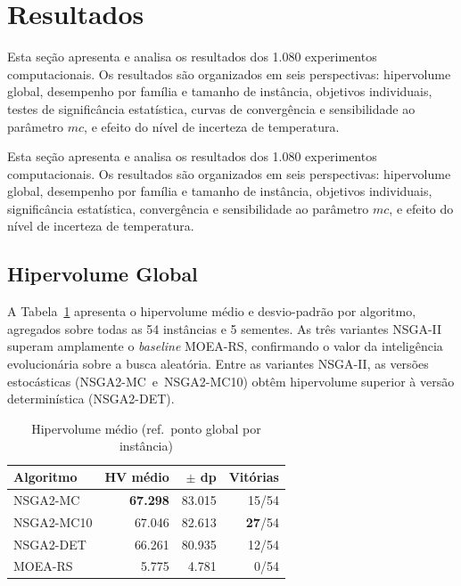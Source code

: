 \documentclass[a4paper,11pt]{article}
\newcommand{\nsmc}{NSGA2\mbox{-}MC\xspace}
\newcommand{\nsmx}{NSGA2\mbox{-}MC10\xspace}
\newcommand{\nsdet}{NSGA2\mbox{-}DET\xspace}
\newcommand{\moers}{MOEA\mbox{-}RS\xspace}
\begin{document}
\section{Resultados}

Esta seção apresenta e analisa os resultados dos 1.080 experimentos computacionais. Os resultados são organizados em seis perspectivas: hipervolume global, desempenho por família e tamanho de instância, objetivos individuais, testes de significância estatística, curvas de convergência e sensibilidade ao parâmetro $mc$, e efeito do nível de incerteza de temperatura.



Esta seção apresenta e analisa os resultados dos 1.080 experimentos computacionais. Os resultados são organizados em seis perspectivas: hipervolume global, desempenho por família e tamanho de instância, objetivos individuais, significância estatística, convergência e sensibilidade ao parâmetro $mc$, e efeito do nível de incerteza de temperatura.

\subsection{Hipervolume Global}

A Tabela~\ref{tab:hv_global} apresenta o hipervolume médio e desvio-padrão
por algoritmo, agregados sobre todas as 54 inst\^ancias e 5 sementes.
As tr\^es variantes NSGA-II superam amplamente o \textit{baseline} \moers,
confirmando o valor da intelig\^encia evolucionária sobre a busca aleatória.
Entre as variantes NSGA-II, as versões estocásticas (\nsmc~e~\nsmx) obt\^em
hipervolume superior à versão determinística (\nsdet).

\begin{table}[ht]
\centering
\caption{Hipervolume médio (ref.\ ponto global por inst\^ancia)}
\label{tab:hv_global}
\begin{tabular}{lrrr}
\toprule
\textbf{Algoritmo} & \textbf{HV médio} & \textbf{$\pm$ dp} & \textbf{Vitórias} \\
\midrule
\nsmc  & \textbf{67.298} & 83.015 & 15/54 \\
\nsmx  & 67.046 & 82.613 & \textbf{27}/54 \\
\nsdet & 66.261 & 80.935 & 12/54 \\
\moers & 5.775  &  4.781 &  0/54 \\
\bottomrule
\end{tabular}
\end{table}
\end{document}
